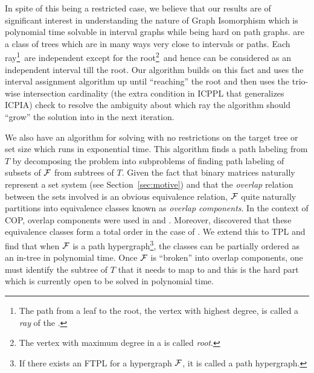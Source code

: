 In spite of this being a restricted case, we believe that our results
are of significant interest in understanding the nature of {\sc Graph
  Isomorphism} which is polynomial time solvable in interval graphs
while being hard on path graphs\cite{kklv10}. {\kstars} are a class of
trees which are in many ways very close to intervals or paths. Each
ray\footnote{The path from a leaf to the root, the vertex with highest
  degree, is called a {\em ray} of the \kstar.}~\footnotemark[4] are
independent except for the root\footnote{The vertex with maximum
  degree in a {\kstar} is called {\em root}.}~\footnotemark[4] and
hence can be considered as an independent interval till the root. Our
algorithm builds on this fact and uses the interval assignment
algorithm\cite{nsnrs09} up until ``reaching'' the root and then uses
the trio-wise intersection cardinality (the extra condition in ICPPL
that generalizes ICPIA) check to resolve the ambiguity about which ray
the algorithm should ``grow'' the solution into in the next iteration.

We also have an algorithm for solving {\CFTPL} with no restrictions on
the target tree or set size which runs in exponential time.  This
algorithm finds a path labeling from $T$ by decomposing the problem
into subproblems of finding path labeling of subsets of ${\cal F}$ from
subtrees of $T$. Given the fact that binary matrices naturally
represent a set system (see Section~\ref{sec:motive}) and that the
{\em overlap} relation between the sets involved is an obvious
equivalence relation, ${\cal F}$ quite naturally partitions into
equivalence classes known as {\em overlap components}. In the context
of COP, overlap components were used in \cite{wlh02} and
\cite{kklv10}. Moreover, \cite{nsnrs09} discovered that these
equivalence classes form a total order in the case of \COP. We extend this to TPL and find
that when ${\cal F}$ is a path hypergraph\footnote{If there exists an FTPL
  for a hypergraph ${\cal F}$, it is called a path hypergraph.}, the
classes can be partially ordered as an in-tree in polynomial
time. Once ${\cal F}$ is ``broken'' into overlap components, one must
identify the subtree of $T$ that it needs to map to and this is the
hard part which is currently open to be solved in polynomial time.
